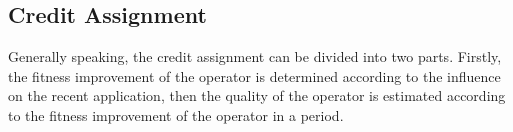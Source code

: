 \documentclass[journal]{IEEEtran}
\begin{document}

\subsection{Credit Assignment \label{credit_ass}}
Generally speaking, the credit assignment can be divided into two parts. Firstly, the fitness improvement of the operator is determined according to the influence on the recent application, then the quality of the operator is estimated according to the fitness improvement of the operator in a period.
\end{document}
